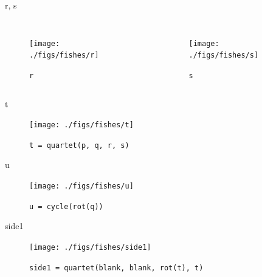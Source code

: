\documentclass{beamer}
\begin{document}
    \begin{frame}{r, s}
        \begin{columns}[T,onlytextwidth]
                \begin{figure}
                    \centering
                    \texttt{[image: ./figs/fishes/r]}
                    \caption{\texttt{r}}
                    \label{fig:r}
                \end{figure}

                \begin{figure}
                    \centering
                    \texttt{[image: ./figs/fishes/s]}
                    \caption{\texttt{s}}
                    \label{fig:s}
                \end{figure}
        \end{columns}

    \end{frame}

    \begin{frame}{t}

        \begin{figure}
            \centering
            \texttt{[image: ./figs/fishes/t]}
            \caption{\texttt{t = quartet(p, q, r, s)}}
            \label{fig:t}
        \end{figure}

    \end{frame}

    \begin{frame}{u}

        \begin{figure}
            \centering
            \texttt{[image: ./figs/fishes/u]}
            \caption{\texttt{u = cycle(rot(q))}}
            \label{fig:u}
        \end{figure}

    \end{frame}

    \begin{frame}{side1}

        \begin{figure}
            \centering
            \texttt{[image: ./figs/fishes/side1]}
            \caption{\texttt{side1 = quartet(blank, blank, rot(t), t)}}
            \label{fig:side1}
        \end{figure}

    \end{frame}
\end{document}
